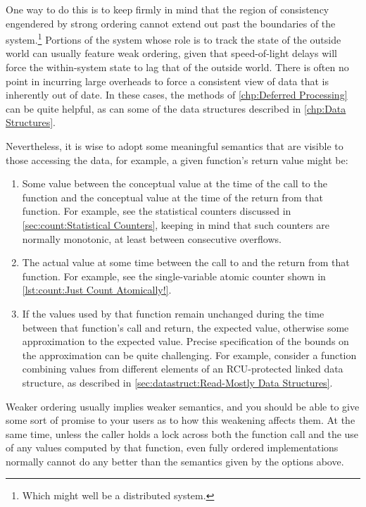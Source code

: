 One way to do this is to keep firmly in mind that the region of
consistency engendered by strong ordering cannot extend out past the
boundaries of the system.\footnote{
	Which might well be a distributed system.}
Portions of the system whose role is to track the state of the outside
world can usually feature weak ordering, given that speed-of-light delays
will force the within-system state to lag that of the outside world.
There is often no point in incurring large overheads to force a consistent
view of data that is inherently out of date.
In these cases, the methods of \cref{chp:Deferred Processing} can be
quite helpful, as can some of the data structures described in
\cref{chp:Data Structures}.

Nevertheless, it is wise to adopt some meaningful semantics that are
visible to those accessing the data, for example, a given function's
return value might be:

\begin{enumerate}
\item	Some value between the conceptual value at the time of the call
	to the function and the conceptual value at the time of the
	return from that function.
	For example, see the statistical counters discussed in
	\cref{sec:count:Statistical Counters}, keeping in mind that such
	counters are normally monotonic, at least between consecutive
	overflows.
\item	The actual value at some time between the call to and the return
	from that function.
	For example, see the single-variable atomic counter shown in
	\cref{lst:count:Just Count Atomically!}.
\item	If the values used by that function remain unchanged during the
	time between that function's call and return, the expected
	value, otherwise some approximation to the expected value.
	Precise specification of the bounds on the approximation can
	be quite challenging.
	For example, consider a function combining values from
	different elements of an RCU-protected linked data structure,
	as described in \cref{sec:datastruct:Read-Mostly Data Structures}.
\end{enumerate}

Weaker ordering usually implies weaker semantics, and you should be
able to give some sort of promise to your users as to how this weakening
affects them.
At the same time, unless the caller holds a lock across both the
function call and the use of any values computed by that function,
even fully ordered implementations normally cannot do any better
than the semantics given by the options above.

